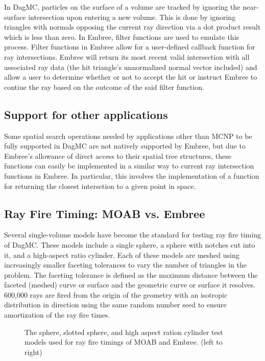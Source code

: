 \documentclass{anstrans}
\begin{document}
In DagMC, particles on the surface of a volume are tracked by ignoring the near-surface intersection upon entering a new volume. This is done by ignoring triangles with normals opposing the current ray direction via a dot product result which is less than zero. In Embree, filter functions are used to emulate this process. Filter functions in Embree allow for a user-defined callback function for ray intersections. Embree will return its most recent valid intersection with all associated ray data (the hit triangle's unnormalized normal vector included) and allow a user to determine whether or not to accept the hit or instruct Embree to contiue the ray based on the outcome of the said filter function.

\subsection{Support for other applications}

Some spatial search operations needed by applications other than MCNP to be fully supported in DagMC are not natively supported by Embree, but due to Embree's allowance of direct access to their spatial tree structures, these functions can easily be implemented in a similar way to current ray intersection functions in Embree. In particular, this involves the implementation of a function for returning the closest intersetion to a given point in space.

\subsection{Ray Fire Timing: MOAB vs. Embree}

Several single-volume models have become the standard for testing ray fire timing of DagMC. These models include a single sphere, a sphere with notches cut into it, and a high-aspect ratio cylinder. Each of these models are meshed using increasingly smaller faceting tolerances to vary the number of triangles in the problem. The faceting tolerance is defined as the maximum distance between the faceted (meshed) curve or surface and the geometric curve or surface it resolves. 600,000 rays are fired from the origin of the geometry with an isotropic distribution in direction using the same random number seed to ensure amortization of the ray fire times.

\begin{figure}

  \begin{center}

    \caption{The sphere, slotted sphere, and high aspect ration cylinder test models used for ray fire timings of MOAB and Embree. (left to right) }

  \end{center}

\end{figure}
\end{document}

